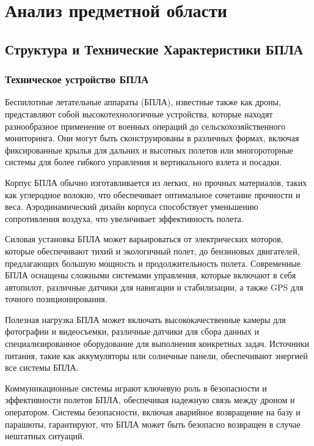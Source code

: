 \section{Анализ предметной области}
\subsection{Структура и Технические Характеристики БПЛА}
\subsubsection{Техническое устройство БПЛА}
Беспилотные летательные аппараты (БПЛА), известные также как дроны, представляют собой высокотехнологичные устройства, которые находят разнообразное применение от военных операций до сельскохозяйственного мониторинга. Они могут быть сконструированы в различных формах, включая фиксированные крылья для дальних и высотных полетов или многороторные системы для более гибкого управления и вертикального взлета и посадки.

Корпус БПЛА обычно изготавливается из легких, но прочных материалов, таких как углеродное волокно, что обеспечивает оптимальное сочетание прочности и веса. Аэродинамический дизайн корпуса способствует уменьшению сопротивления воздуха, что увеличивает эффективность полета.

Силовая установка БПЛА может варьироваться от электрических моторов, которые обеспечивают тихий и экологичный полет, до бензиновых двигателей, предлагающих большую мощность и продолжительность полета. Современные БПЛА оснащены сложными системами управления, которые включают в себя автопилот, различные датчики для навигации и стабилизации, а также GPS для точного позиционирования.

Полезная нагрузка БПЛА может включать высококачественные камеры для фотографии и видеосъемки, различные датчики для сбора данных и специализированное оборудование для выполнения конкретных задач. Источники питания, такие как аккумуляторы или солнечные панели, обеспечивают энергией все системы БПЛА.

Коммуникационные системы играют ключевую роль в безопасности и эффективности полетов БПЛА, обеспечивая надежную связь между дроном и оператором. Системы безопасности, включая аварийное возвращение на базу и парашюты, гарантируют, что БПЛА может быть безопасно возвращен в случае нештатных ситуаций.
